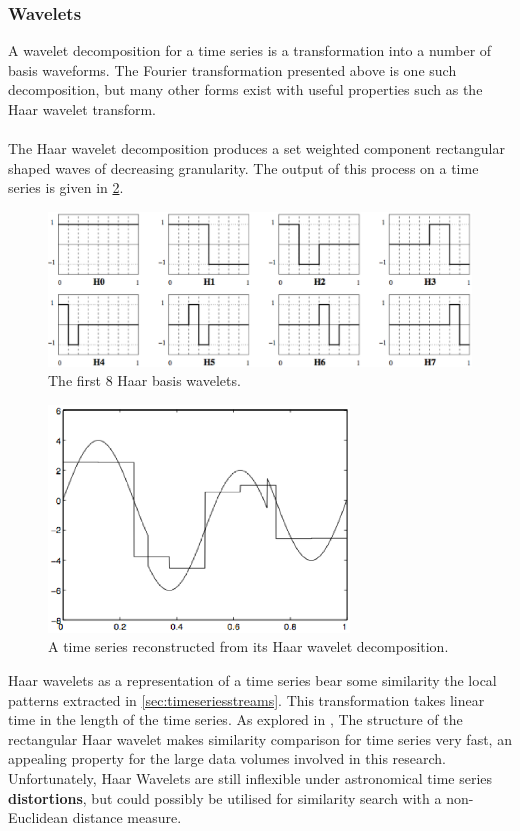 	\subsubsection{Wavelets}
	A wavelet decomposition for a time series is a transformation into a number of basis waveforms. The Fourier transformation presented above is one such decomposition, but many other forms exist with useful properties such as the Haar wavelet transform. 
	\paragraph{}
	The Haar wavelet decomposition produces a set weighted component rectangular shaped waves of decreasing granularity. The output of this process on a time series is given in \ref{fig:haarreconstruction}.

	\begin{figure}[ht!]
	\centering
	\includegraphics[width=120mm]{images/haarbasis.eps}
	\caption{The first 8 Haar basis wavelets.}
	\label{fig:haarwavelets}
	\end{figure}
	
	\begin{figure}[ht!]
	\centering
	\includegraphics[width=80mm]{images/haarreconstruction.eps}
	\caption{A time series reconstructed from its Haar wavelet decomposition.}
	\label{fig:haarreconstruction}
	\end{figure}


	Haar wavelets as a representation of a time series bear some similarity the local patterns extracted in \ref{sec:timeseriesstreams}. This transformation takes linear time in the length of the time series. As explored in \citep{popivanov2002similarity}, The structure of the rectangular Haar wavelet makes similarity comparison for time series very fast, an appealing property for the large data volumes involved in this research. Unfortunately, Haar Wavelets are still inflexible under astronomical time series \textbf{distortions}, but could possibly be utilised for similarity search with a non-Euclidean distance measure.
	
